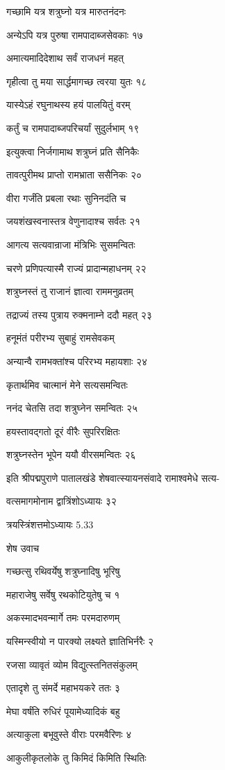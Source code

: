 गच्छामि यत्र शत्रुघ्नो यत्र मारुतनंदनः

अन्येऽपि यत्र पुरुषा रामपादाब्जसेवकाः १७

अमात्यमादिदेशाथ सर्वं राजधनं महत्

गृहीत्वा तु मया सार्द्धमागच्छ त्वरया युतः १८

यास्येऽहं रघुनाथस्य हयं पालयितुं वरम्

कर्तुं च रामपादाब्जपरिचर्यां सुदुर्लभाम् १९

इत्युक्त्वा निर्जगामाथ शत्रुघ्नं प्रति सैनिकैः

तावत्पुरीमथ प्राप्तो रामभ्राता ससैनिकः २०

वीरा गर्जंति प्रबला रथाः सुनिनदंति च

जयशंखस्वनास्तत्र वेणुनादाश्च सर्वतः २१

आगत्य सत्यवान्राजा मंत्रिभिः सुसमन्वितः

चरणे प्रणिपत्यास्मै राज्यं प्रादान्महाधनम् २२

शत्रुघ्नस्तं तु राजानं ज्ञात्वा राममनुव्रतम्

तद्राज्यं तस्य पुत्राय रुक्मनाम्ने ददौ महत् २३

हनूमंतं परीरभ्य सुबाहुं रामसेवकम्

अन्यान्वै रामभक्तांश्च परिरभ्य महायशाः २४

कृतार्थमिव चात्मानं मेने सत्यसमन्वितः

ननंद चेतसि तदा शत्रुघ्नेन समन्वितः २५

हयस्तावद्गतो दूरं वीरैः सुपरिरक्षितः

शत्रुघ्नस्तेन भूपेन ययौ वीरसमन्वितः २६

इति श्रीपद्मपुराणे पातालखंडे शेषवात्स्यायनसंवादे रामाश्वमेधे सत्य-

वत्समागमोनाम द्वात्रिंशोऽध्यायः ३२

त्रयस्त्रिंशत्तमोऽध्यायः 5.33

शेष उवाच

गच्छत्सु रथिवर्येषु शत्रुघ्नादिषु भूरिषु

महाराजेषु सर्वेषु रथकोटियुतेषु च १

अकस्मादभवन्मार्गे तमः परमदारुणम्

यस्मिन्स्वीयो न पारक्यो लक्ष्यते ज्ञातिभिर्नरैः २

रजसा व्यावृतं व्योम विद्युत्स्तनितसंकुलम्

एतादृशे तु संमर्दे महाभयकरे ततः ३

मेघा वर्षंति रुधिरं पूयामेध्यादिकं बहु

अत्याकुला बभूवुस्ते वीराः परमवैरिणः ४

आकुलीकृतलोके तु किमिदं किमिति स्थितिः

